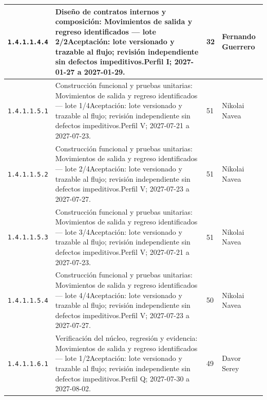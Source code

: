\begin{longtable}{L{29mm}L{80mm}R{12mm}L{28mm}}
\texttt{1.\allowbreak{}4.\allowbreak{}1.\allowbreak{}1.\allowbreak{}4.\allowbreak{}4} & Diseño de contratos internos y composición: Movimientos de salida y regreso identificados — lote 2/2\newline Aceptación: lote versionado y trazable al flujo; revisión independiente sin defectos impeditivos.\newline Perfil I; 2027-01-27 a 2027-01-29. & 32 & Fernando Guerrero\\\hline
\texttt{1.\allowbreak{}4.\allowbreak{}1.\allowbreak{}1.\allowbreak{}5.\allowbreak{}1} & Construcción funcional y pruebas unitarias: Movimientos de salida y regreso identificados — lote 1/4\newline Aceptación: lote versionado y trazable al flujo; revisión independiente sin defectos impeditivos.\newline Perfil V; 2027-07-21 a 2027-07-23. & 51 & Nikolai Navea\\\hline
\texttt{1.\allowbreak{}4.\allowbreak{}1.\allowbreak{}1.\allowbreak{}5.\allowbreak{}2} & Construcción funcional y pruebas unitarias: Movimientos de salida y regreso identificados — lote 2/4\newline Aceptación: lote versionado y trazable al flujo; revisión independiente sin defectos impeditivos.\newline Perfil V; 2027-07-23 a 2027-07-27. & 51 & Nikolai Navea\\\hline
\texttt{1.\allowbreak{}4.\allowbreak{}1.\allowbreak{}1.\allowbreak{}5.\allowbreak{}3} & Construcción funcional y pruebas unitarias: Movimientos de salida y regreso identificados — lote 3/4\newline Aceptación: lote versionado y trazable al flujo; revisión independiente sin defectos impeditivos.\newline Perfil V; 2027-07-21 a 2027-07-23. & 51 & Nikolai Navea\\\hline
\texttt{1.\allowbreak{}4.\allowbreak{}1.\allowbreak{}1.\allowbreak{}5.\allowbreak{}4} & Construcción funcional y pruebas unitarias: Movimientos de salida y regreso identificados — lote 4/4\newline Aceptación: lote versionado y trazable al flujo; revisión independiente sin defectos impeditivos.\newline Perfil V; 2027-07-23 a 2027-07-27. & 50 & Nikolai Navea\\\hline
\texttt{1.\allowbreak{}4.\allowbreak{}1.\allowbreak{}1.\allowbreak{}6.\allowbreak{}1} & Verificación del núcleo, regresión y evidencia: Movimientos de salida y regreso identificados — lote 1/2\newline Aceptación: lote versionado y trazable al flujo; revisión independiente sin defectos impeditivos.\newline Perfil Q; 2027-07-30 a 2027-08-02. & 49 & Davor Serey\\\hline

\end{longtable}
